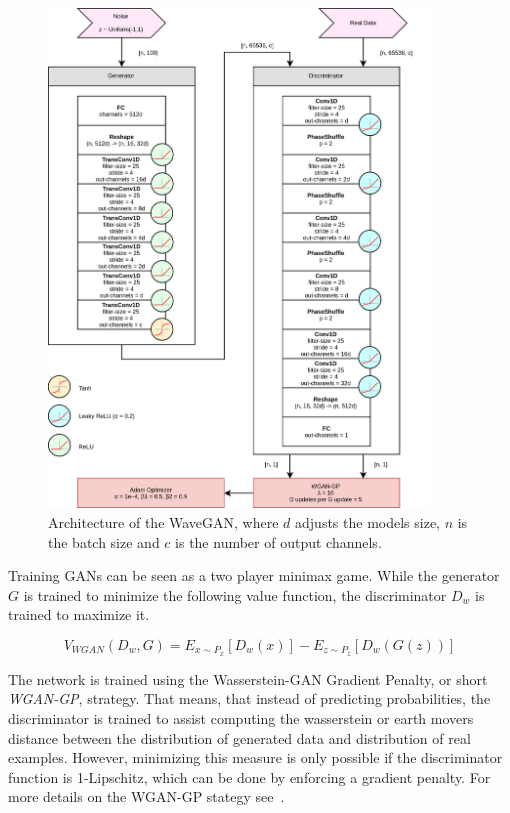 \documentclass[12pt]{article}
\begin{document}
\begin{figure}[ht!]
\includegraphics[width=0.9\textwidth]{img/wavegan-arch.png}
\caption{Architecture of the WaveGAN, where $d$ adjusts the models size, $n$ is the batch size and $c$ is the number of output channels.}%
\label{fig:WaveGan-arch}
\end{figure}

Training GANs can be seen as a two player minimax game. 
While the generator $G$ is trained to minimize the following value function, the discriminator
$D_w$ is trained to maximize it.

$$
V_{WGAN}(D_w, G) = E_{x \sim P_x}[D_w(x)] - E_{z \sim P_z}[D_w(G(z))]
$$

The network is trained using the Wasserstein-GAN Gradient Penalty, or short \emph{WGAN-GP}, strategy.
That means, that instead of predicting probabilities, the discriminator is trained to assist computing the wasserstein or
earth movers distance between the distribution of generated data and distribution of real examples.
However, minimizing this measure is only possible if the discriminator function is 1-Lipschitz, which can be done by enforcing a gradient penalty.
For more details on the WGAN-GP stategy see~\cite{gulrajani2017improved}.
\end{document}
